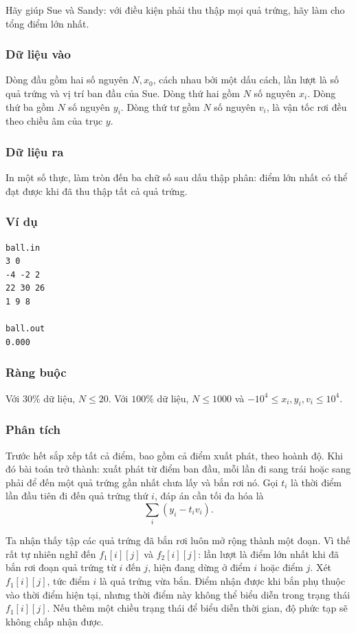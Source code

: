 \documentclass[11pt]{article}
\begin{document}
Hãy giúp Sue và Sandy: với điều kiện phải thu thập mọi quả trứng, hãy làm cho
tổng điểm lớn nhất.

\subsubsection*{Dữ liệu vào}

Dòng đầu gồm hai số nguyên $N,x_0$, cách nhau bởi một dấu cách, lần lượt là số
quả trứng và vị trí ban đầu của Sue. Dòng thứ hai gồm $N$ số nguyên $x_i$.
Dòng thứ ba gồm $N$ số nguyên $y_i$. Dòng thứ tư gồm $N$ số nguyên $v_i$, là
vận tốc rơi đều theo chiều âm của trục $y$.

\subsubsection*{Dữ liệu ra}

In một số thực, làm tròn đến ba chữ số sau dấu thập phân: điểm lớn nhất có thể
đạt được khi đã thu thập tất cả quả trứng.

\subsubsection*{Ví dụ}

\begin{verbatim}
ball.in
3 0
-4 -2 2
22 30 26
1 9 8

ball.out
0.000
\end{verbatim}

\subsubsection*{Ràng buộc}

Với $30\%$ dữ liệu, $N\le 20$. Với $100\%$ dữ liệu, $N\le 1000$ và
$-10^4\le x_i,y_i,v_i\le 10^4$.

\subsubsection*{Phân tích}

Trước hết sắp xếp tất cả điểm, bao gồm cả điểm xuất phát, theo hoành độ. Khi
đó bài toán trở thành: xuất phát từ điểm ban đầu, mỗi lần đi sang trái hoặc
sang phải để đến một quả trứng gần nhất chưa lấy và bắn rơi nó. Gọi $t_i$ là
thời điểm lần đầu tiên đi đến quả trứng thứ $i$, đáp án cần tối đa hóa là
\[
  \sum_i (y_i-t_i v_i).
\]

Ta nhận thấy tập các quả trứng đã bắn rơi luôn mở rộng thành một đoạn. Vì thế
rất tự nhiên nghĩ đến $f_1[i][j]$ và $f_2[i][j]$: lần lượt là điểm lớn nhất
khi đã bắn rơi đoạn quả trứng từ $i$ đến $j$, hiện đang dừng ở điểm $i$ hoặc
điểm $j$. Xét $f_1[i][j]$, tức điểm $i$ là quả trứng vừa bắn. Điểm nhận được
khi bắn phụ thuộc vào thời điểm hiện tại, nhưng thời điểm này không thể biểu
diễn trong trạng thái $f_1[i][j]$. Nếu thêm một chiều trạng thái để biểu diễn
thời gian, độ phức tạp sẽ không chấp nhận được.
\end{document}
